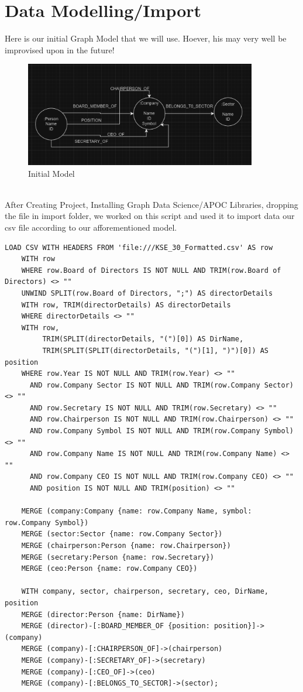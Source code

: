 \documentclass[12pt]{article}
\begin{document}
\section{Data Modelling/Import}
Here is our initial Graph Model that we will use. Hoever, his may very well be improvised upon in the future! \\
\begin{figure}[htbp]
    \centering
    \includegraphics[width=0.9\textwidth]{Initial_Model.png} %
    \caption{Initial Model}
  \end{figure}
\\
After Creating Project, Installing Graph Data Science/APOC Libraries, dropping the file in import folder, we worked on this script and used it to import data our csv file according to our afforementioned model.
\begin{lstlisting}[frame=single]
    LOAD CSV WITH HEADERS FROM 'file:///KSE_30_Formatted.csv' AS row
    WITH row
    WHERE row.Board of Directors IS NOT NULL AND TRIM(row.Board of Directors) <> ""
    UNWIND SPLIT(row.Board of Directors, ";") AS directorDetails
    WITH row, TRIM(directorDetails) AS directorDetails
    WHERE directorDetails <> ""
    WITH row, 
         TRIM(SPLIT(directorDetails, "(")[0]) AS DirName, 
         TRIM(SPLIT(SPLIT(directorDetails, "(")[1], ")")[0]) AS position
    WHERE row.Year IS NOT NULL AND TRIM(row.Year) <> ""
      AND row.Company Sector IS NOT NULL AND TRIM(row.Company Sector) <> ""
      AND row.Secretary IS NOT NULL AND TRIM(row.Secretary) <> ""
      AND row.Chairperson IS NOT NULL AND TRIM(row.Chairperson) <> ""
      AND row.Company Symbol IS NOT NULL AND TRIM(row.Company Symbol) <> ""
      AND row.Company Name IS NOT NULL AND TRIM(row.Company Name) <> ""
      AND row.Company CEO IS NOT NULL AND TRIM(row.Company CEO) <> ""
      AND position IS NOT NULL AND TRIM(position) <> ""
    
    MERGE (company:Company {name: row.Company Name, symbol: row.Company Symbol})
    MERGE (sector:Sector {name: row.Company Sector})
    MERGE (chairperson:Person {name: row.Chairperson})
    MERGE (secretary:Person {name: row.Secretary})
    MERGE (ceo:Person {name: row.Company CEO})
    
    WITH company, sector, chairperson, secretary, ceo, DirName, position
    MERGE (director:Person {name: DirName})
    MERGE (director)-[:BOARD_MEMBER_OF {position: position}]->(company)
    MERGE (company)-[:CHAIRPERSON_OF]->(chairperson)
    MERGE (company)-[:SECRETARY_OF]->(secretary)
    MERGE (company)-[:CEO_OF]->(ceo)
    MERGE (company)-[:BELONGS_TO_SECTOR]->(sector);
\end{lstlisting}
\end{document}
